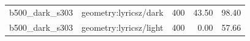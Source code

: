 \begin{longtable}{l>{\raggedright\arraybackslash}p{.42\linewidth}rrr}
b500\_\allowbreak{}dark\_\allowbreak{}s303 & %
geometry:lyricsz/dark & %
400 & %
43.50 & %
98.40 \\ %

b500\_\allowbreak{}dark\_\allowbreak{}s303 & %
geometry:lyricsz/light & %
400 & %
0.00 & %
57.66 \\ %


\end{longtable}
